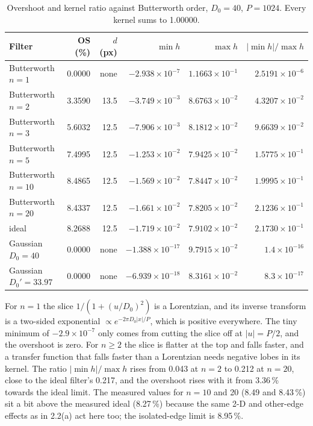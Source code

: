 \begin{table}[H]
\centering
\begin{tabular}{lrrrrr}
\toprule
Filter & OS (\%) & $d$ (px) & $\min h$ & $\max h$ & $|\min h|/\max h$\\
\midrule
Butterworth $n=1$ & 0.0000 & none & $-2.938\times10^{-7}$ & $1.1663\times10^{-1}$ & $2.5191\times10^{-6}$\\
Butterworth $n=2$ & 3.3590 & 13.5 & $-3.749\times10^{-3}$ & $8.6763\times10^{-2}$ & $4.3207\times10^{-2}$\\
Butterworth $n=3$ & 5.6032 & 12.5 & $-7.906\times10^{-3}$ & $8.1812\times10^{-2}$ & $9.6639\times10^{-2}$\\
Butterworth $n=5$ & 7.4995 & 12.5 & $-1.253\times10^{-2}$ & $7.9425\times10^{-2}$ & $1.5775\times10^{-1}$\\
Butterworth $n=10$ & 8.4865 & 12.5 & $-1.569\times10^{-2}$ & $7.8447\times10^{-2}$ & $1.9995\times10^{-1}$\\
Butterworth $n=20$ & 8.4337 & 12.5 & $-1.661\times10^{-2}$ & $7.8205\times10^{-2}$ & $2.1236\times10^{-1}$\\
ideal & 8.2688 & 12.5 & $-1.719\times10^{-2}$ & $7.9102\times10^{-2}$ & $2.1730\times10^{-1}$\\
Gaussian $D_0=40$ & 0.0000 & none & $-1.388\times10^{-17}$ & $9.7915\times10^{-2}$ & $1.4\times10^{-16}$\\
Gaussian $D_0'=33.97$ & 0.0000 & none & $-6.939\times10^{-18}$ & $8.3161\times10^{-2}$ & $8.3\times10^{-17}$\\
\bottomrule
\end{tabular}
\caption{Overshoot and kernel ratio against Butterworth order, $D_0=40$,
$P=1024$. Every kernel sums to 1.00000.}
\label{tab:bw}
\end{table}

For $n=1$ the slice $1/(1+(u/D_0)^2)$ is a Lorentzian, and its inverse
transform is a two-sided exponential $\propto e^{-2\pi D_0|x|/P}$, which is
positive everywhere. The tiny minimum of $-2.9\times10^{-7}$ only comes from
cutting the slice off at $|u|=P/2$, and the overshoot is zero. For $n\ge2$ the
slice is flatter at the top and falls faster, and a transfer function that
falls faster than a Lorentzian needs negative lobes in its kernel. The ratio
$|\min h|/\max h$ rises from 0.043 at $n=2$ to 0.212 at $n=20$, close to the
ideal filter's 0.217, and the overshoot rises with it from 3.36\,\% towards the
ideal limit. The measured values for $n=10$ and 20 (8.49 and 8.43\,\%) sit a bit
above the measured ideal (8.27\,\%) because the same 2-D and other-edge effects
as in 2.2(a) act here too; the isolated-edge limit is 8.95\,\%.


